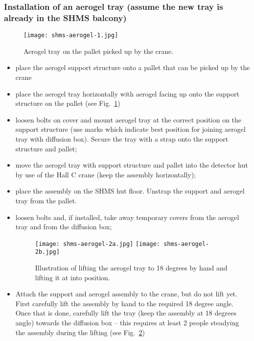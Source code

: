 \subsubsection*{Installation of an aerogel tray (assume the new tray is
already in the SHMS balcony)}

\begin{figure}
\begin{center}
\texttt{[image: shms-aerogel-1.jpg]}
\caption{\label{fig:shms-aerogel-1}Aerogel tray on the pallet picked
  up by the crane.  }
\end{center}
\end{figure}

\begin{itemize}
  \item place the aerogel support structure onto a pallet that can be
    picked up by the crane
  \item place the aerogel tray horizontally with aerogel facing up
    onto the support structure on the pallet (see Fig.~\ref{fig:shms-aerogel-1})
  \item loosen bolts on cover and mount aerogel tray at the correct
    position on the support structure (use marks which indicate best
    position for joining aerogel tray with diffusion box). Secure the
    tray with a strap onto the support structure and pallet;
  \item  move the aerogel tray with support structure and pallet
    into the detector hut by use of the Hall C crane (keep the
    assembly horizontally);
  \item place the assembly on the SHMS hut floor. Unstrap the support
    and aerogel tray from the pallet.
  \item loosen bolts and, if installed, take away temporary covers
    from the aerogel tray and from the diffusion box;

\begin{figure}
\begin{center}
\texttt{[image: shms-aerogel-2a.jpg]}
\texttt{[image: shms-aerogel-2b.jpg]}
\caption{\label{fig:shms-aerogel-2}Illustration of lifting the aerogel
  tray to 18 degrees by hand and lifting it at into position.}
\end{center}
\end{figure}

  \item Attach the support and aerogel assembly to the crane, but do
    not lift yet. First carefully lift the assembly by hand to the
    required 18 degree angle. Once that is done, carefully lift the
    tray (keep the assembly at 18 degrees angle) towards the diffusion
    box – this requires at least 2 people steadying the assembly
    during the lifting (see Fig.~\ref{fig:shms-aerogel-2})


\end{itemize}
